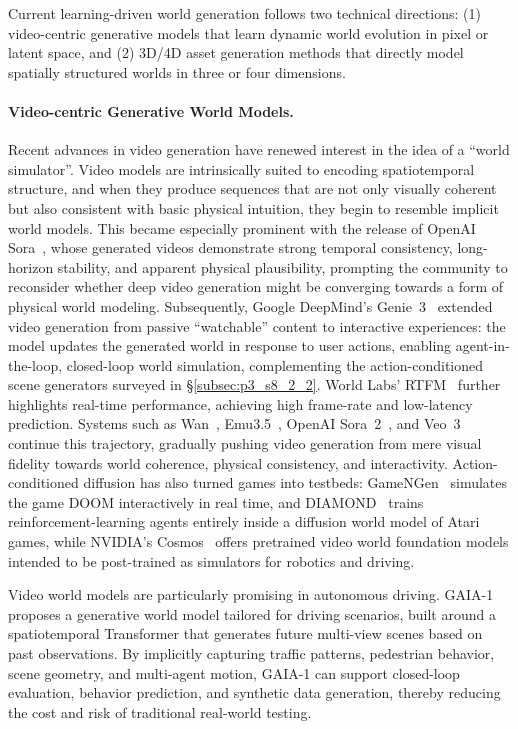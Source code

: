 Current learning-driven world generation follows two technical directions:
(1) video-centric generative models that learn dynamic world evolution in pixel or latent space,
and (2) 3D/4D asset generation methods that directly model spatially structured worlds in three or four dimensions.




\paragraph{Video-centric Generative World Models.}
Recent advances in video generation have renewed interest in the idea of a ``world simulator''.
Video models are intrinsically suited to encoding spatiotemporal structure, and when they produce sequences that are not only visually coherent but also consistent with basic physical intuition, they begin to resemble implicit world models.
This became especially prominent with the release of OpenAI Sora~\cite{sora2024}, whose generated videos demonstrate strong temporal consistency, long-horizon stability, and apparent physical plausibility, prompting the community to reconsider whether deep video generation might be converging towards a form of physical world modeling.
Subsequently, Google DeepMind's Genie~3~\cite{genie3} extended video generation from passive ``watchable'' content to interactive experiences: the model updates the generated world in response to user actions, enabling agent-in-the-loop, closed-loop world simulation, complementing the action-conditioned scene generators surveyed in §\ref{subsec:p3_s8_2_2}.
World Labs' RTFM~\cite{worldlabs_rtfm} further highlights real-time performance, achieving high frame-rate and low-latency prediction. Systems such as Wan~\cite{wan2025wan}, Emu3.5~\cite{cui2025emu35}, OpenAI Sora~2~\cite{sora2}, and Veo~3~\cite{veo3} continue this trajectory, gradually pushing video generation from mere visual fidelity towards world coherence, physical consistency, and interactivity.
Action-conditioned diffusion has also turned games into testbeds: GameNGen~\cite{valevski2024diffusion} simulates the game DOOM interactively in real time, and DIAMOND~\cite{alonso2024diffusionworldmodelingvisual} trains reinforcement-learning agents entirely inside a diffusion world model of Atari games, while NVIDIA's Cosmos~\cite{nvidia2025cosmos} offers pretrained video world foundation models intended to be post-trained as simulators for robotics and driving.

Video world models are particularly promising in autonomous driving. GAIA-1~\cite{hu2023gaia} proposes a generative world model tailored for driving scenarios, built around a spatiotemporal Transformer that generates future multi-view scenes based on past observations.
By implicitly capturing traffic patterns, pedestrian behavior, scene geometry, and multi-agent motion, GAIA-1 can support closed-loop evaluation, behavior prediction, and synthetic data generation, thereby reducing the cost and risk of traditional real-world testing.



